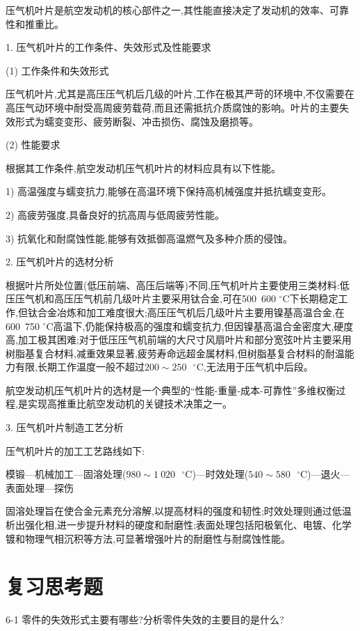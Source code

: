 \documentclass[UTF8]{ctexbook}
\newcommand{\◎}{\ensuremath{\bigcirc}}
\begin{document}
压气机叶片是航空发动机的核心部件之一,其性能直接决定了发动机的效率、可靠性和推重比。

1. 压气机叶片的工作条件、失效形式及性能要求

(1) 工作条件和失效形式

压气机叶片,尤其是高压压气机后几级的叶片,工作在极其严苛的环境中,不仅需要在高压气动环境中耐受高周疲劳载荷,而且还需抵抗介质腐蚀的影响。叶片的主要失效形式为蠕变变形、疲劳断裂、冲击损伤、腐蚀及磨损等。

(2) 性能要求

根据其工作条件,航空发动机压气机叶片的材料应具有以下性能。

1) 高温强度与蠕变抗力,能够在高温环境下保持高机械强度并抵抗蠕变变形。

2) 高疲劳强度,具备良好的抗高周与低周疲劳性能。

3) 抗氧化和耐腐蚀性能,能够有效抵御高温燃气及多种介质的侵蚀。

2. 压气机叶片的选材分析

根据叶片所处位置(低压前端、高压后端等)不同,压气机叶片主要使用三类材料:低压压气机和高压压气机前几级叶片主要采用钛合金,可在500~600 $^\circ$C下长期稳定工作,但钛合金冶炼和加工难度很大;高压压气机后几级叶片主要用镍基高温合金,在600~750 $^\circ$C高温下,仍能保持极高的强度和蠕变抗力,但因镍基高温合金密度大,硬度高,加工极其困难;对于低压压气机前端的大尺寸风扇叶片和部分宽弦叶片主要采用树脂基复合材料,减重效果显著,疲劳寿命远超金属材料,但树脂基复合材料的耐温能力有限,长期工作温度一般不超过$200\sim250\text{ }^\circ\text{C}$,无法用于压气机中后段。

航空发动机压气机叶片的选材是一个典型的“性能-重量-成本-可靠性”多维权衡过程,是实现高推重比航空发动机的关键技术决策之一。

3. 压气机叶片制造工艺分析

压气机叶片的加工工艺路线如下:

模锻—机械加工—固溶处理($980\sim1\ 020\text{ }^\circ\text{C}$)—时效处理($540\sim580\text{ }^\circ\text{C}$)—退火—表面处理—探伤

固溶处理旨在使合金元素充分溶解,以提高材料的强度和韧性;时效处理则通过低温析出强化相,进一步提升材料的硬度和耐磨性;表面处理包括阳极氧化、电镀、化学镀和物理气相沉积等方法,可显著增强叶片的耐磨性与耐腐蚀性能。

\section*{复习思考题}

 
6-1 零件的失效形式主要有哪些?分析零件失效的主要目的是什么?
\end{document}

